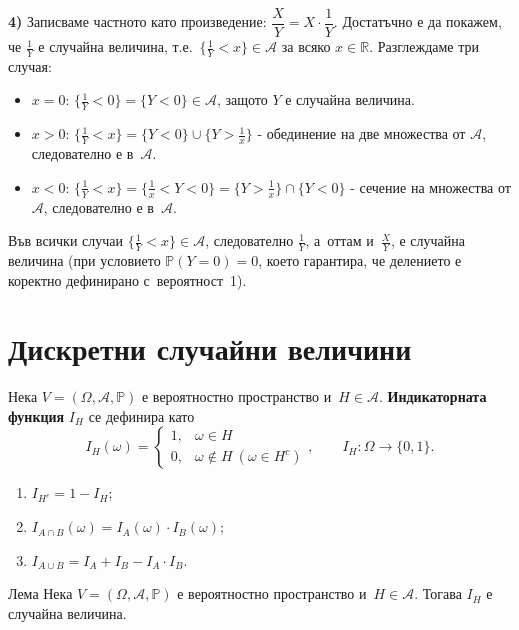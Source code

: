 \begin{proofbox}
\textbf{4)} Записваме частното като произведение: $\dfrac{X}{Y}=X\cdot
\dfrac1Y$. Достатъчно е да покажем, че $\tfrac1Y$ е случайна
величина, т.е.\ $\{\tfrac1Y<x\}\in\mathcal A$ за всяко
$x\in\mathbb R$. Разглеждаме три случая:
\begin{itemize}[nosep]
  \item $x=0$: $\{\tfrac1Y<0\}=\{Y<0\}\in\mathcal A$, защото $Y$ е случайна величина.
  \item $x>0$: $\{\tfrac1Y<x\} = \{Y<0\}\cup\{Y>\tfrac1x\}$ - обединение на две множества от $\mathcal A$, следователно е в~$\mathcal A$.
  \item $x<0$: $\{\tfrac1Y<x\} = \{\tfrac1x<Y<0\} = \{Y>\tfrac1x\}\cap\{Y<0\}$ - сечение на множества от $\mathcal A$, следователно е в~$\mathcal A$.
\end{itemize}
Във всички случаи $\{\tfrac1Y<x\}\in\mathcal A$, следователно
$\tfrac1Y$, а~оттам и~$\tfrac{X}{Y}$, е случайна величина (при
условието $\mathbb P(Y=0)=0$, което гарантира, че делението е
коректно дефинирано с~вероятност~1). \qedbg
\end{proofbox}

\section{Дискретни случайни величини}

\begin{defbox}
Нека $V=(\Omega,\mathcal A,\mathbb P)$ е вероятностно пространство и~$H\in\mathcal A$. \textbf{Индикаторната функция} $I_H$ се
дефинира като
\[
  I_H(\omega) = \begin{cases} 1, & \omega\in H\\ 0, & \omega\notin H \ (\omega\in H^c)\end{cases},
  \qquad I_H:\Omega\to\{0,1\}.
\]
\end{defbox}

\begin{corbox}
\begin{enumerate}[label=\arabic*)]
  \item $I_{H^c} = 1-I_H$;
  \item $I_{A\cap B}(\omega) = I_A(\omega)\cdot I_B(\omega)$;
  \item $I_{A\cup B} = I_A+I_B-I_A\cdot I_B$.
\end{enumerate}
\end{corbox}

\begin{thmbox}[]{Лема}
Нека $V=(\Omega,\mathcal A,\mathbb P)$ е вероятностно пространство и~$H\in\mathcal A$. Тогава $I_H$ е случайна величина.
\end{thmbox}

